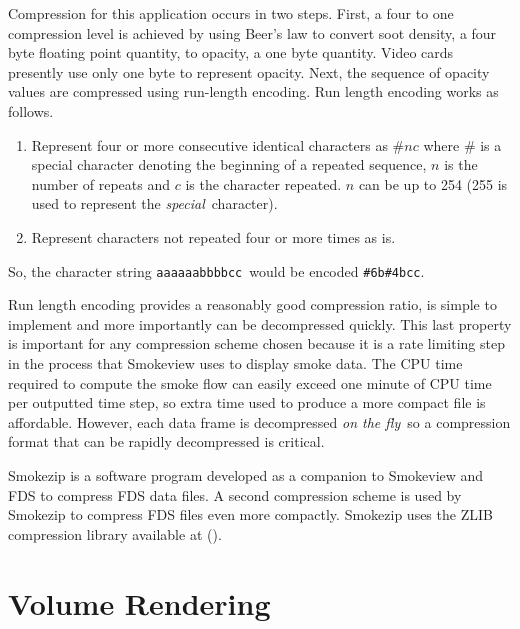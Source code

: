 Compression for this application occurs in two steps.  First, a
four to one compression level is achieved by using Beer's law to
convert soot density, a four byte floating point quantity, to
opacity, a one byte quantity.  Video cards presently use only one
byte to represent opacity. Next, the sequence of opacity values
are compressed using run-length encoding. Run length encoding
works as follows.

\begin{enumerate}
\item Represent four or more consecutive identical characters as
$\# n c$ where $\#$ is a special character denoting the beginning
of a repeated sequence, $n$ is the number of repeats and $c$ is
the character repeated.  $n$ can be up to 254 (255 is used to
represent the {\em special}\ character). \item Represent
characters not repeated four or more times as is.
\end{enumerate}

So, the character string {\tt aaaaaabbbbcc}\ would be encoded {\tt \#6b\#4bcc}.

Run length encoding provides a reasonably good compression ratio,
is simple to implement and more importantly can be decompressed
quickly. This last property is important for any compression
scheme chosen because it is a rate limiting step in the process
that Smokeview uses to display smoke data. The CPU time required
to compute the smoke flow can easily exceed one minute of CPU time
per outputted time step, so extra time used to produce a more
compact file is affordable. However, each data frame is
decompressed {\em on the fly}\ so a compression format that can be
rapidly decompressed is critical.

Smokezip is a software program developed as a companion to
Smokeview and FDS to compress FDS data files. A second compression
scheme is used by Smokezip to compress FDS files even more
compactly.  Smokezip uses the ZLIB compression library available
at ().

\section{Volume Rendering}
